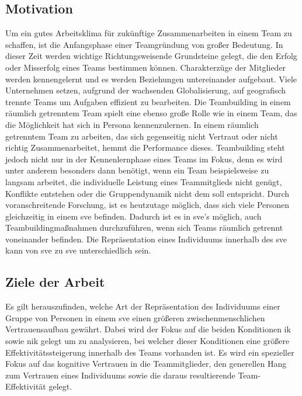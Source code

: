 \documentclass[a4paper,11pt]{article}%
\renewcommand{\\}{\vspace*{0.5\baselineskip} \newline}
\begin{document}
	\subsection{Motivation}
	Um ein gutes Arbeitsklima für zukünftige Zusammenarbeiten in einem Team zu schaffen, ist die Anfangsphase einer Teamgründung von großer Bedeutung. In dieser Zeit werden wichtige Richtungsweisende Grundsteine gelegt, die den Erfolg oder Misserfolg eines Teams bestimmen können. Charakterzüge der Mitglieder werden kennengelernt und es werden Beziehungen untereinander aufgebaut. \\	
	Viele Unternehmen setzen, aufgrund der wachsenden Globalisierung, auf geografisch trennte Teams um Aufgaben effizient zu bearbeiten. Die Teambuilding in einem räumlich getrenntem Team spielt eine ebenso große Rolle wie in einem Team, das die Möglichkeit hat sich in Persona kennenzulernen. \\
	In einem räumlich getrenntem Team zu arbeiten, das sich gegenseitig nicht Vertraut oder nicht richtig Zusammenarbeitet, hemmt die Performance dieses. \citep[p. 98-107]{huang1998supporting} \citep[p. 399-417]{turoff1993distributed} \\	
	Teambuilding steht jedoch nicht nur in der Kennenlernphase eines Teams im Fokus, denn es wird unter anderem besonders dann benötigt, wenn ein Team beispielsweise zu langsam arbeitet, die individuelle Leistung eines Teammitglieds nicht genügt, Konflikte entstehen oder die Gruppendynamik nicht dem soll entspricht. \citep[p. 1-3]{biech2007pfeiffer}\\
	Durch voranschreitende Forschung, ist es heutzutage möglich, dass sich viele Personen gleichzeitig in einem \glqq \ac{sve} \grqq befinden. Dadurch ist es in \ac{sve}'s möglich, auch Teambuildingmaßnahmen durchzuführen, wenn sich Teams räumlich getrennt voneinander befinden.\\
	Die Repräsentation eines Individuums innerhalb des \ac{sve} kann von \ac{sve} zu \ac{sve} unterschiedlich sein.
	
	\subsection{Ziele der Arbeit}
		Es gilt herauszufinden, welche Art der Repräsentation des Individuums einer Gruppe von Personen in einem \ac{sve} einen größeren zwischenmenschlichen Vertrauensaufbau gewährt.
Dabei wird der Fokus auf die beiden Konditionen \ac{ik} sowie \ac{nik} gelegt um zu analysieren, bei welcher dieser Konditionen eine größere Effektivitätssteigerung innerhalb des Teams vorhanden ist.
Es wird ein spezieller Fokus auf das kognitive Vertrauen in die Teammitglieder, den generellen Hang zum Vertrauen eines Individuums sowie die daraus resultierende Team-Effektivität gelegt.
\end{document}
